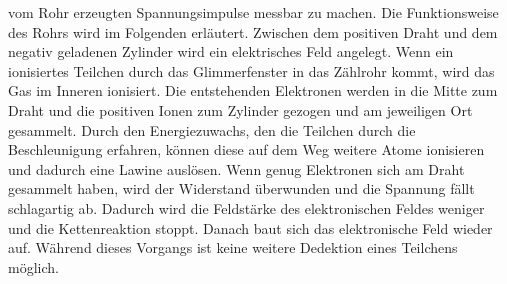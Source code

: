 vom Rohr erzeugten Spannungsimpulse messbar zu machen. 
Die Funktionsweise des Rohrs wird im Folgenden erläutert. 
Zwischen dem positiven Draht und dem negativ geladenen Zylinder wird ein elektrisches 
Feld angelegt. Wenn ein ionisiertes Teilchen durch das Glimmerfenster in das Zählrohr 
kommt, wird das Gas im Inneren ionisiert. Die entstehenden Elektronen werden 
in die Mitte zum Draht und die positiven Ionen zum Zylinder gezogen und am jeweiligen 
Ort gesammelt. Durch den Energiezuwachs, den die Teilchen durch die Beschleunigung 
erfahren, können diese auf dem Weg weitere Atome ionisieren und dadurch eine Lawine
auslösen. Wenn genug Elektronen sich am Draht gesammelt haben, wird der Widerstand überwunden
und die Spannung fällt schlagartig ab. Dadurch wird die Feldstärke des elektronischen Feldes 
weniger und die Kettenreaktion stoppt. Danach baut sich das elektronische Feld wieder auf. 
Während dieses Vorgangs ist keine weitere Dedektion eines Teilchens möglich. 
 
